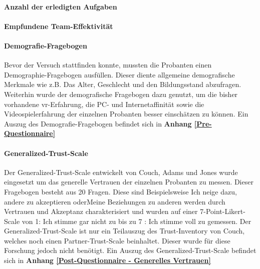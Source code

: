 \documentclass[a4paper,11pt]{article}%
\renewcommand{\\}{\vspace*{0.5\baselineskip} \newline}
\begin{document}
\paragraph{Anzahl der erledigten Aufgaben}
\paragraph{Empfundene Team-Effektivität}		
				
		\paragraph{Demografie-Fragebogen}
Bevor der Versuch stattfinden konnte, mussten die Probanten einen Demographie-Fragebogen ausfüllen. Dieser diente allgemeine demografische Merkmale wie z.B. Das Alter, Geschlecht und den Bildungsstand abzufragen. Weiterhin wurde der demografische Fragebogen dazu genutzt, um die bisher vorhandene \ac{vr}-Erfahrung, die PC- und Internetaffinität sowie die Videospielerfahrung der einzelnen Probanten besser einschätzen zu können.
Ein Auszug des Demografie-Fragebogen befindet sich in \textbf{Anhang \ref{Pre-Questionnaire}}

		\paragraph{Generalized-Trust-Scale}
Der Generalized-Trust-Scale entwickelt von Couch, Adams und Jones \citep{couch1996assessment} wurde eingesetzt um das generelle Vertrauen der einzelnen Probanten zu messen.
Dieser Fragebogen besteht aus 20 Fragen. Diese sind Beispielsweise \dq{}Ich neige dazu, andere zu akzeptieren \dq{} oder\dq{}Meine Beziehungen zu anderen werden durch Vertrauen und Akzeptanz charakterisiert \dq{} und wurden auf einer 7-Point-Likert-Scale von \dq{}1: Ich stimme gar nicht zu\dq{} bis zu \dq{}7 : Ich stimme voll zu\dq{} gemessen. Der Generalized-Trust-Scale ist nur ein Teilauszug des \dq{}Trust-Inventory von Couch\dq{}, welches noch einen \dq{}Partner-Trust-Scale \dq{} beinhaltet. Dieser wurde für diese Forschung jedoch nicht benötigt. 
Ein Auszug des Generalized-Trust-Scale befindet sich in \textbf{Anhang \ref{Post-Questionnaire - Generelles Vertrauen}}

%			
\end{document}
